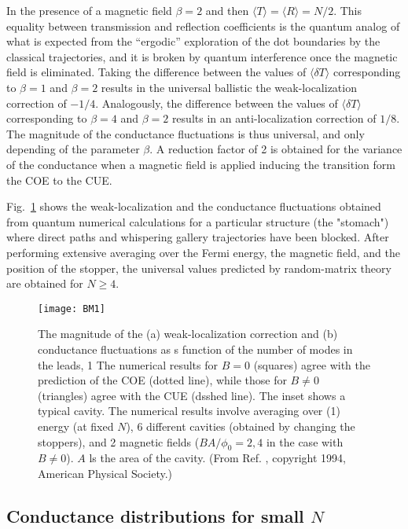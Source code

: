 \documentclass[a4paper,10pt]{article}
\newcommand{\nin}{\noindent}
\begin{document}
\nin In the presence of a magnetic field $\beta=2$ and then
$\langle T\rangle=\langle R\rangle=N/2$. This equality between transmission and reflection coefficients is the quantum analog of what is expected from the ``ergodic'' exploration of the dot boundaries by the classical trajectories, and it is broken by quantum interference once the magnetic field is eliminated. Taking the difference between the values of $\langle \delta T \rangle $ corresponding to $\beta =1$ and $\beta=2$ results in the universal ballistic the weak-localization  correction of $-1/4$. Analogously, the difference between the values of $\langle \delta T \rangle $ corresponding to $\beta =4$ and $\beta=2$ results in an anti-localization correction of $1/8$. The magnitude of the conductance fluctuations is thus universal, and only depending of the parameter $\beta$. A reduction factor of 2 is obtained for the variance of the conductance when a magnetic field is applied inducing the transition form the COE to the CUE. 

\nin Fig.~\ref{fig:BM1} shows the weak-localization and the conductance fluctuations obtained from quantum numerical calculations for a particular structure (the "stomach") where direct paths and whispering gallery trajectories have been blocked. After performing extensive averaging over the Fermi energy, the magnetic field, and the position of the stopper, the universal values predicted by random-matrix theory are obtained for $N \ge 4$.


\begin{figure}
\setlength{\unitlength}{1mm}
\centerline{\texttt{[image: BM1]}}
\caption{
The magnitude of the (a) weak-localization correction and (b) conductance fluctuations as s function of the number of modes in the leads, 1 The numerical results for $B = 0$ (squares) agree with the prediction of the COE (dotted line), while those for $B \ne 0$ (triangles) agree with the CUE (dsshed line). The inset shows a typical cavity. The numerical results involve averaging over (1) energy (at fixed $N$), 6 different cavities (obtained by changing the stoppers), and 2 magnetic fields ($BA/\phi_0 = 2, 4$ in the case with $B \ne 0$). $A$ ls the area of the cavity. (From Ref. \protect\cite{BarMel}, copyright 1994, American Physical Society.)
}
\label{fig:BM1}
\end{figure}

\subsection{Conductance distributions for small $N$}
\end{document}
